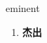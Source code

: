 
\begin{frame}
{\huge eminent}
\begin{center}
\begin{enumerate}\Large
  \item \textbf{杰出}
\end{enumerate}
\end{center}
\end{frame}
